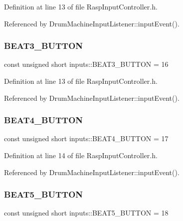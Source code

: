 Definition at line 13 of file Rasp\+Input\+Controller.\+h.



Referenced by Drum\+Machine\+Input\+Listener\+::input\+Event().

\mbox{\label{namespaceinputs_ab60a6fc2188a034f76d3fbe554efe314}} 
\subsubsection{\texorpdfstring{B\+E\+A\+T3\+\_\+\+B\+U\+T\+T\+ON}{BEAT3\_BUTTON}}
{\footnotesize\ttfamily const unsigned short inputs\+::\+B\+E\+A\+T3\+\_\+\+B\+U\+T\+T\+ON = 16}



Definition at line 13 of file Rasp\+Input\+Controller.\+h.



Referenced by Drum\+Machine\+Input\+Listener\+::input\+Event().

\mbox{\label{namespaceinputs_af65f26f63a9572003a2bc49e7955e319}} 
\subsubsection{\texorpdfstring{B\+E\+A\+T4\+\_\+\+B\+U\+T\+T\+ON}{BEAT4\_BUTTON}}
{\footnotesize\ttfamily const unsigned short inputs\+::\+B\+E\+A\+T4\+\_\+\+B\+U\+T\+T\+ON = 17}



Definition at line 14 of file Rasp\+Input\+Controller.\+h.



Referenced by Drum\+Machine\+Input\+Listener\+::input\+Event().

\mbox{\label{namespaceinputs_a8a027829529daa53a24ece7b8334164b}} 
\subsubsection{\texorpdfstring{B\+E\+A\+T5\+\_\+\+B\+U\+T\+T\+ON}{BEAT5\_BUTTON}}
{\footnotesize\ttfamily const unsigned short inputs\+::\+B\+E\+A\+T5\+\_\+\+B\+U\+T\+T\+ON = 18}



